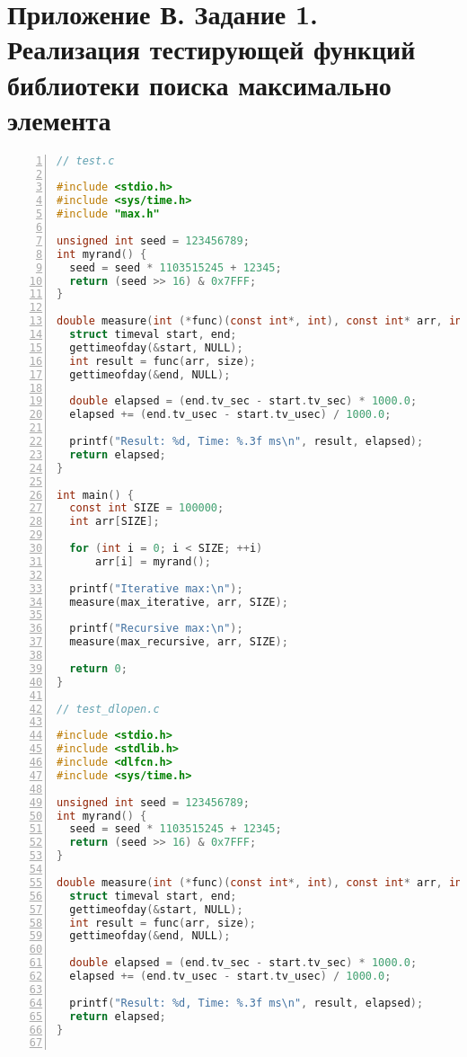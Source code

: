 \section*{Приложение В. Задание 1. Реализация тестирующей функций библиотеки поиска максимально элемента}

\begin{lstlisting}[language=C,numbers=left]
// test.c

#include <stdio.h>
#include <sys/time.h>
#include "max.h"

unsigned int seed = 123456789;
int myrand() {
  seed = seed * 1103515245 + 12345;
  return (seed >> 16) & 0x7FFF;
}

double measure(int (*func)(const int*, int), const int* arr, int size) {
  struct timeval start, end;
  gettimeofday(&start, NULL);
  int result = func(arr, size);
  gettimeofday(&end, NULL);

  double elapsed = (end.tv_sec - start.tv_sec) * 1000.0;
  elapsed += (end.tv_usec - start.tv_usec) / 1000.0;

  printf("Result: %d, Time: %.3f ms\n", result, elapsed);
  return elapsed;
}

int main() {
  const int SIZE = 100000;
  int arr[SIZE];

  for (int i = 0; i < SIZE; ++i)
      arr[i] = myrand();

  printf("Iterative max:\n");
  measure(max_iterative, arr, SIZE);

  printf("Recursive max:\n");
  measure(max_recursive, arr, SIZE);

  return 0;
}

// test_dlopen.c

#include <stdio.h>
#include <stdlib.h>
#include <dlfcn.h>
#include <sys/time.h>

unsigned int seed = 123456789;
int myrand() {
  seed = seed * 1103515245 + 12345;
  return (seed >> 16) & 0x7FFF;
}

double measure(int (*func)(const int*, int), const int* arr, int size) {
  struct timeval start, end;
  gettimeofday(&start, NULL);
  int result = func(arr, size);
  gettimeofday(&end, NULL);

  double elapsed = (end.tv_sec - start.tv_sec) * 1000.0;
  elapsed += (end.tv_usec - start.tv_usec) / 1000.0;

  printf("Result: %d, Time: %.3f ms\n", result, elapsed);
  return elapsed;
}


\end{lstlisting}

